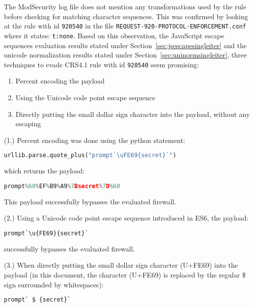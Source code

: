 The ModSecurity log file does not mention any transformations used by the rule before checking for matching character sequences. This was confirmed by looking at the rule with id \verb|920540| in the file \verb|REQUEST-920-PROTOCOL-ENFORCEMENT.conf| where it states: \verb|t:none|. Based on this observation, the JavaScript escape sequences evaluation results stated under Section~\ref{sec:jsescapesingleiter} and the unicode normalization results stated under Section~\ref{sec:uninormsingleiter}, three techniques to evade CRS4.1 rule with id \verb|920540| seem promising:

\begin{enumerate}
	\item Percent encoding the payload
	\item Using the Unicode code point escape sequence
	\item Directly putting the small dollar sign character into the payload, without any escaping
\end{enumerate}

(1.) Percent encoding was done using the python statement:

\begin{lstlisting}[style=basicStyle, language=Python]
urllib.parse.quote_plus("prompt`\uFE69{secret}`")
\end{lstlisting}

which returns the payload:

\begin{lstlisting}[style=basicStyle, language=Python]
prompt%60%EF%B9%A9%7Bsecret%7D%60
\end{lstlisting}

This payload successfully bypasses the evaluated firewall. 

(2.) Using a Unicode code point escape sequence introduced in ES6, the payload:

\begin{lstlisting}[style=basicStyle, language=Python]
prompt`\u{FE69}{secret}`
\end{lstlisting}

successfully bypasses the evaluated firewall.

(3.) When directly putting the small dollar sign character (U+FE69) into the payload (in this document, the character (U+FE69) is replaced by the regular \$ sign surrounded by whitespaces):

\begin{lstlisting}[style=basicStyle, language=Python]
prompt` $ {secret}`
\end{lstlisting}

